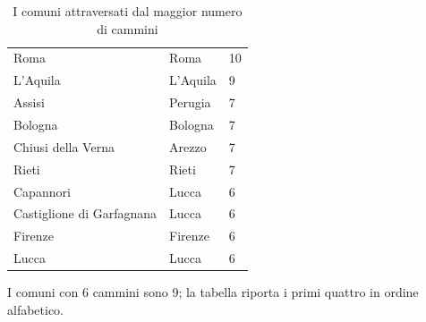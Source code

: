 \begin{table}[!htbp]
\begin{tabella}
\caption{I comuni attraversati dal maggior numero di cammini}\label{tab:topcomuni}
\begin{tabularx}{\linewidth}{|L|P{4.2cm}|R{2.2cm}|}
\hline
{} &  & \\ \hline
Roma & Roma & 10\\ \hline
L'Aquila & L'Aquila & 9\\ \hline
Assisi & Perugia & 7\\ \hline
Bologna & Bologna & 7\\ \hline
Chiusi della Verna & Arezzo & 7\\ \hline
Rieti & Rieti & 7\\ \hline
Capannori & Lucca & 6\\ \hline
Castiglione di Garfagnana & Lucca & 6\\ \hline
Firenze & Firenze & 6\\ \hline
Lucca & Lucca & 6\\ \hline
\end{tabularx}
\end{tabella}
\par\vspace{2pt}\footnotesize I comuni con 6 cammini sono 9; la tabella riporta i primi quattro in ordine alfabetico.\par\normalsize
\end{table}

